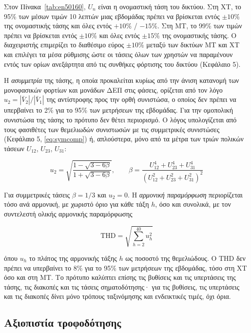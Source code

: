 Στον Πίνακα~\ref{tab:en50160}, $U_n$ είναι η ονομαστική τάση του δικτύου. Στη ΧΤ, το 95\% των
μέσων τιμών 10 λεπτών μιας εβδομάδας πρέπει να βρίσκεται εντός $\pm 10\%$ της ονομαστικής
τάσης και όλες εντός $+10\%$ / $-15\%$. Στη ΜΤ, το 99\% των τιμών πρέπει να βρίσκεται εντός
$\pm 10\%$ και όλες εντός $\pm 15\%$ της ονομαστικής τάσης. Ο διαχειριστής επιμερίζει το
διαθέσιμο εύρος $\pm 10\%$ μεταξύ των δικτύων ΜΤ και ΧΤ και επιλέγει τα μέσα ρύθμισης ώστε οι
τάσεις όλων των χρηστών να παραμένουν εντός των ορίων ανεξάρτητα από τις συνθήκες φόρτισης του
δικτύου (Κεφάλαιο 5).

Η \emph{ασυμμετρία} της τάσης, η οποία προκαλείται κυρίως από την άνιση κατανομή των μονοφασικών
φορτίων και μονάδων ΔΕΠ στις φάσεις, ορίζεται από τον λόγο $u_2 = |\bar{V}_2|/|\bar{V}_1|$
της αντίστροφης προς την ορθή συνιστώσα, ο οποίος δεν πρέπει να υπερβαίνει το 2\% για το 95\%
των μετρήσεων της εβδομάδας. Για την ομοπολική συνιστώσα της τάσης το πρότυπο δεν θέτει
περιορισμό. Ο λόγος υπολογίζεται από τους φασιθέτες των θεμελιωδών
συνιστωσών με τις συμμετρικές συνιστώσες (Κεφάλαιο 5, \eqref{eq:symcomp}) ή, απλούστερα, μόνο
από τα μέτρα των τριών πολικών τάσεων $U_{12}$, $U_{23}$, $U_{31}$:

\begin{equation}
u_2 = \sqrt{\frac{1 - \sqrt{3 - 6\beta}}{1 + \sqrt{3 - 6\beta}}}, \qquad
\beta = \frac{U_{12}^4 + U_{23}^4 + U_{31}^4}{\left(U_{12}^2 + U_{23}^2 + U_{31}^2\right)^2}
\label{eq:vuf-line}
\end{equation}

Για συμμετρικές τάσεις $\beta = 1/3$ και $u_2 = 0$. Η \emph{αρμονική παραμόρφωση} περιορίζεται
τόσο ανά αρμονική, με χωριστό όριο για κάθε τάξη $h$, όσο και συνολικά, με τον συντελεστή
ολικής αρμονικής παραμόρφωσης

\begin{equation}
\mathrm{THD} = \sqrt{\sum_{h=2}^{40} u_h^2}
\label{eq:thd}
\end{equation}

όπου $u_h$ το πλάτος της αρμονικής τάξης $h$ ως ποσοστό της θεμελιώδους. Ο THD δεν πρέπει να
υπερβαίνει το 8\% για το 95\% των μετρήσεων της εβδομάδας, τόσο στη ΧΤ όσο και στη ΜΤ. Το
πρότυπο καλύπτει επίσης τις βυθίσεις και τις υπερτάσεις της τάσης, τις διακοπές και τις
τάσεις σηματοδότησης· για τις βυθίσεις, τις υπερτάσεις και τις διακοπές δίνει μόνο τρόπους
ταξινόμησης και ενδεικτικές τιμές, όχι όρια.

\subsection{Αξιοπιστία τροφοδότησης}
\label{sec:reliability}

